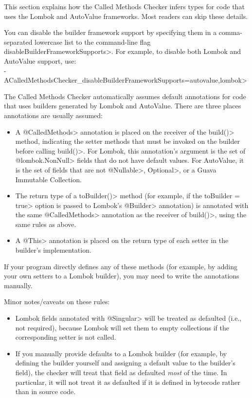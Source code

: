 
This section explains how the Called Methods Checker infers types for code
that uses the Lombok and AutoValue frameworks. Most readers can skip these
details.

You can disable the builder framework support by specifying them in a
comma-separated lowercase list to the command-line flag
\<disableBuilderFrameworkSupports>.  For example, to disable both Lombok
and AutoValue support, use: \\
\<-ACalledMethodsChecker\_disableBuilderFrameworkSupports=autovalue,lombok>

The Called Methods Checker automatically assumes default annotations for code that uses builders generated
by Lombok and AutoValue. There are three places annotations are usually assumed:
\begin{itemize}
\item A \<@CalledMethods> annotation is placed on the receiver of the
  \<build()> method, indicating the setter methods that must be invoked on
  the builder before calling \<build()>. For Lombok, this annotation's
  argument is the set of \<@lombok.NonNull> fields that do not have default
  values.  For AutoValue, it is the set of fields that are not
  \<@Nullable>, \<Optional>, or a Guava Immutable Collection.
\item The return type of a \<toBuilder()> method (for example, if the
  \<toBuilder = true> option is passed to Lombok's \<@Builder> annotation)
  is annotated with the same \<@CalledMethods> annotation as the receiver
  of \<build()>, using the same rules as above.
\item A \<@This> annotation is placed on the return type of each setter in
  the builder's implementation.
\end{itemize}

If your program directly defines any of these methods (for example, by adding your own setters to
a Lombok builder), you may need to write the annotations manually.

Minor notes/caveats on these rules:
\begin{itemize}
\item Lombok fields annotated with \<@Singular> will be treated as defaulted (i.e., not required), because
Lombok will set them to empty collections if the corresponding setter is not called.
\item If you manually provide defaults to a Lombok builder (for example, by defining the builder yourself
and assigning a default value to the builder's field), the checker will treat that field as defaulted
\emph{most} of the time. In particular, it will not treat it as defaulted if it is defined in bytecode rather
than in source code.
\end{itemize}


